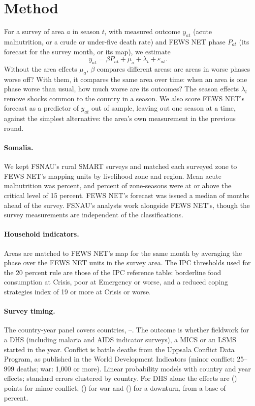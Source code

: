 \documentclass[11pt]{article}
\begin{document}
\FloatBarrier
\appendix
\section{Method}\label{app:method}

For a survey of area $a$ in season $t$, with measured outcome $y_{at}$ (acute malnutrition, or a crude or under-five death rate) and FEWS NET phase $P_{at}$ (its forecast for the survey month, or its map), we estimate
\begin{equation*}
y_{at} = \beta P_{at} + \mu_a + \lambda_t + \varepsilon_{at}.
\end{equation*}
Without the area effects $\mu_a$, $\beta$ compares different areas: are areas in worse phases worse off? With them, it compares the same area over time: when an area is one phase worse than usual, how much worse are its outcomes? The season effects $\lambda_t$ remove shocks common to the country in a season. We also score FEWS NET's forecast as a predictor of $y_{at}$ out of sample, leaving out one season at a time, against the simplest alternative: the area's own measurement in the previous round.

\paragraph{Somalia.} We kept FSNAU's rural SMART surveys and matched each surveyed zone to FEWS NET's mapping units by livelihood zone and region. Mean acute malnutrition was \fsGam{} percent, and \fsCrit{} percent of zone-seasons were at or above the critical level of 15 percent. FEWS NET's forecast was issued a median of \fsLead{} months ahead of the survey. FSNAU's analysts work alongside FEWS NET's, though the survey measurements are independent of the classifications.

\paragraph{Household indicators.} Areas are matched to FEWS NET's map for the same month by averaging the phase over the FEWS NET units in the survey area. The IPC thresholds used for the 20 percent rule are those of the IPC reference table: borderline food consumption at Crisis, poor at Emergency or worse, and a reduced coping strategies index of 19 or more at Crisis or worse.

\paragraph{Survey timing.} The country-year panel covers \gapCountries{} countries, \gapYearZero{}--\gapYearOne{}. The outcome is whether fieldwork for a DHS (including malaria and AIDS indicator surveys), a MICS or an LSMS started in the year. Conflict is battle deaths from the Uppsala Conflict Data Program, as published in the World Development Indicators (minor conflict: 25--999 deaths; war: 1,000 or more). Linear probability models with country and year effects; standard errors clustered by country. For DHS alone the effects are \gapDhsMinor{} (\gapDhsMinorSe{}) points for minor conflict, \gapDhsWar{} (\gapDhsWarSe{}) for war and \gapDhsDown{} (\gapDhsDownSe{}) for a downturn, from a base of \gapBaseDhs{} percent.
\end{document}
